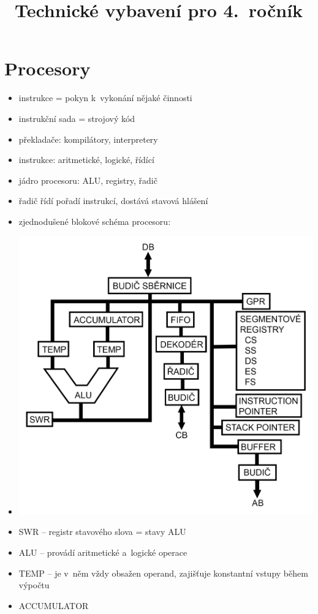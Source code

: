 \documentclass[a4paper,12pt]{article}
\title{Technické vybavení pro 4.~ročník}
\author{}
\date{}
\providecommand{\tightlist}{%
\setlength{\itemsep}{0pt}\setlength{\parskip}{0pt}}
\begin{document}
\maketitle

\section{Procesory}

\begin{itemize}
  \tightlist
  \item instrukce = pokyn k~vykonání nějaké činnosti
  \item instrukční sada = strojový kód
  \item překladače: kompilátory, interpretery
  \item instrukce: aritmetické, logické, řídící
  \item jádro procesoru: ALU, registry, řadič
  \item řadič řídí pořadí instrukcí, dostává stavová hlášení
  \item zjednodušené blokové schéma procesoru:
  \item[] \includegraphics[width=16cm]{ref/blokove-schema-procesoru.png}
  \newpage
  \item SWR -- registr stavového slova = stavy ALU
  \item ALU -- provádí aritmetické a~logické operace
  \item TEMP -- je v~něm vždy obsažen operand, zajišťuje konstantní vstupy
  během výpočtu
  \item ACCUMULATOR
  

\end{itemize}
\end{document}
